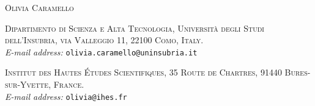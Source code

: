 \documentclass[a4paper,12pt]{article}
\begin{document}
\vspace{1cm}

\textsc{Olivia Caramello} 

\vspace{0.3cm}
{\small \textsc{Dipartimento di Scienza e Alta Tecnologia, Universit\`a degli Studi dell'Insubria, via Valleggio 11, 22100 Como, Italy.}\\
	\emph{E-mail address:} \texttt{olivia.caramello@uninsubria.it}}

\vspace{0.5cm}

{\small \textsc{Institut des Hautes \'Etudes Scientifiques, 35 Route de Chartres,
		91440 Bures-sur-Yvette, France.}\\
	\emph{E-mail address:} \texttt{olivia@ihes.fr}}
\end{document}
